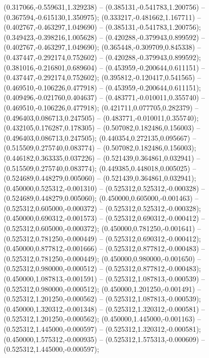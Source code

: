  (0.317066,-0.559631,1.329238) -- (0.385131,-0.541783,1.200756) -- (0.367594,-0.615130,1.350975);
 (0.333217,-0.481662,1.167711) -- (0.402767,-0.463297,1.049690) -- (0.385131,-0.541783,1.200756);
 (0.349423,-0.398216,1.005628) -- (0.420288,-0.379943,0.899592) -- (0.402767,-0.463297,1.049690);
 (0.365448,-0.309709,0.845338) -- (0.437447,-0.292174,0.752602) -- (0.420288,-0.379943,0.899592);
 (0.381016,-0.216801,0.689604) -- (0.453959,-0.200644,0.611151) -- (0.437447,-0.292174,0.752602);
 (0.395812,-0.120417,0.541565) -- (0.469510,-0.106226,0.477918) -- (0.453959,-0.200644,0.611151);
 (0.409496,-0.021760,0.404637) -- (0.483771,-0.010011,0.355740) -- (0.469510,-0.106226,0.477918);
 (0.421711,0.077705,0.282379) -- (0.496403,0.086713,0.247505) -- (0.483771,-0.010011,0.355740);
 (0.432105,0.176287,0.178305) -- (0.507082,0.182486,0.156003) -- (0.496403,0.086713,0.247505);
 (0.440354,0.272135,0.095667) -- (0.515509,0.275740,0.083774) -- (0.507082,0.182486,0.156003);
 (0.446182,0.363335,0.037226) -- (0.521439,0.364861,0.032941) -- (0.515509,0.275740,0.083774);
 (0.449385,0.448018,0.005025) -- (0.524689,0.448279,0.005060) -- (0.521439,0.364861,0.032941);
 (0.450000,0.525312,-0.001310) -- (0.525312,0.525312,-0.000328) -- (0.524689,0.448279,0.005060);
 (0.450000,0.605000,-0.001463) -- (0.525312,0.605000,-0.000372) -- (0.525312,0.525312,-0.000328);
 (0.450000,0.690312,-0.001573) -- (0.525312,0.690312,-0.000412) -- (0.525312,0.605000,-0.000372);
 (0.450000,0.781250,-0.001641) -- (0.525312,0.781250,-0.000449) -- (0.525312,0.690312,-0.000412);
 (0.450000,0.877812,-0.001666) -- (0.525312,0.877812,-0.000483) -- (0.525312,0.781250,-0.000449);
 (0.450000,0.980000,-0.001650) -- (0.525312,0.980000,-0.000512) -- (0.525312,0.877812,-0.000483);
 (0.450000,1.087813,-0.001591) -- (0.525312,1.087813,-0.000539) -- (0.525312,0.980000,-0.000512);
 (0.450000,1.201250,-0.001491) -- (0.525312,1.201250,-0.000562) -- (0.525312,1.087813,-0.000539);
 (0.450000,1.320312,-0.001348) -- (0.525312,1.320312,-0.000581) -- (0.525312,1.201250,-0.000562);
 (0.450000,1.445000,-0.001163) -- (0.525312,1.445000,-0.000597) -- (0.525312,1.320312,-0.000581);
 (0.450000,1.575312,-0.000935) -- (0.525312,1.575313,-0.000609) -- (0.525312,1.445000,-0.000597);
